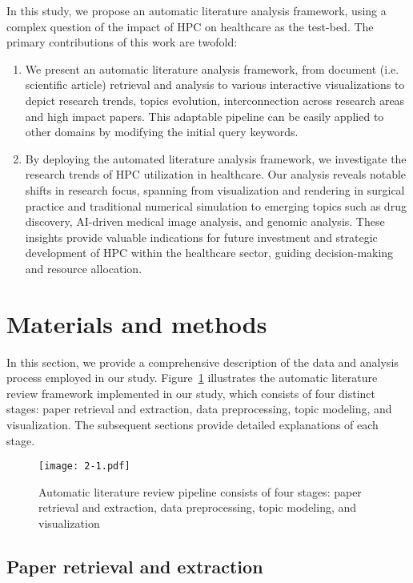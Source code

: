 In this study, we propose an automatic literature analysis framework, using a complex question of the impact of HPC on healthcare as the test-bed. The primary contributions of this work are twofold:

\begin{enumerate}
\item We present an automatic literature analysis framework, from document (i.e. scientific article) retrieval and analysis to various interactive visualizations to depict research trends, topics evolution, interconnection across research areas and high impact papers. This adaptable pipeline can be easily applied to other domains by modifying the initial query keywords.
\item By deploying the automated literature analysis framework, we investigate the research trends of HPC utilization in healthcare. Our analysis reveals notable shifts in research focus, spanning from visualization and rendering in surgical practice and traditional numerical simulation to emerging topics such as drug discovery, AI-driven medical image analysis, and genomic analysis. These insights provide valuable indications for future investment and strategic development of HPC within the healthcare sector, guiding decision-making and resource allocation.
\end{enumerate}

\section{Materials and methods}\label{se:2-2}

In this section, we provide a comprehensive description of the data and analysis process employed in our study. Figure~\ref{fig:2-1} illustrates the automatic literature review framework implemented in our study, which consists of four distinct stages: paper retrieval and extraction, data preprocessing, topic modeling, and visualization. The subsequent sections provide detailed explanations of each stage.
\begin{figure}[!h]
\centering
\texttt{[image: 2-1.pdf]}
\caption{Automatic literature review pipeline consists of four stages: paper retrieval and extraction, data preprocessing, topic modeling, and visualization}
\label{fig:2-1}
\end{figure}


\subsection{Paper retrieval and extraction}\label{subse:2-2.1}
